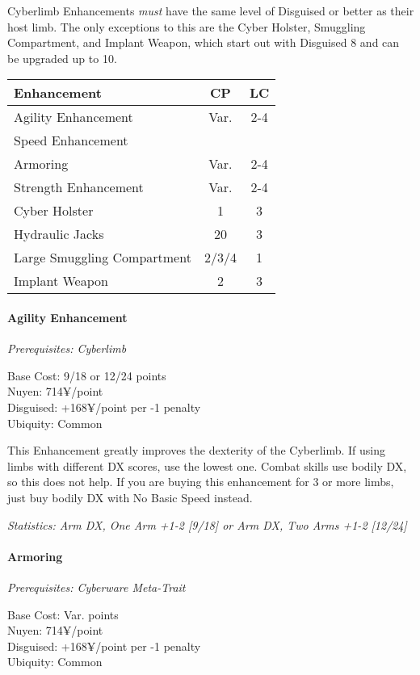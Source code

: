 \begin{multicols*}{3}
	Cyberlimb Enhancements \textit{must} have the same level of Disguised or better as their host limb. The only exceptions to this are the Cyber Holster, Smuggling Compartment, and Implant Weapon, which start out with Disguised 8 and can be upgraded up to 10.
	
	\begin{center}
		\begin{tabularx}{0.33\textwidth}{|X|c|c|}
			\hline
			Enhancement & CP & LC\\
			\hline
			\hline
			Agility Enhancement & Var. & 2-4 \\
			Speed Enhancement & & \\
			Armoring & Var. & 2-4 \\
			Strength Enhancement & Var. & 2-4 \\
			Cyber Holster & 1 & 3 \\
			Hydraulic Jacks & 20 & 3 \\
			Large Smuggling Compartment & 2/3/4 & 1\\
			Implant Weapon & 2 & 3 \\
			\hline
		\end{tabularx}
	\end{center}
	
	\paragraph{Agility Enhancement}
	\textit{Prerequisites: Cyberlimb}
	\begin{flushright}
		Base Cost: 9/18 or 12/24 points\\
		Nuyen: 714¥/point\\
		Disguised: +168¥/point per -1 penalty\\
		Ubiquity: Common\\
	\end{flushright}
	
	This Enhancement greatly improves the dexterity of the Cyberlimb. If using limbs with different DX scores, use the lowest one. Combat skills use bodily DX, so this does not help. If you are buying this enhancement for 3 or more limbs, just buy bodily DX with No Basic Speed instead. 
	
	\textit{\textcolor{OliveGreen}{Statistics: Arm DX, One Arm +1-2 [9/18] or Arm DX, Two Arms +1-2 [12/24]}}
	
	\paragraph{Armoring}
	\textit{Prerequisites: Cyberware Meta-Trait}
	\begin{flushright}
		Base Cost: Var. points\\
		Nuyen: 714¥/point\\
		Disguised: +168¥/point per -1 penalty\\
		Ubiquity: Common\\
	\end{flushright}
	

\end{multicols*}
